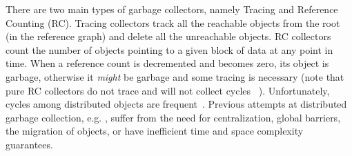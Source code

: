 There are two main types of garbage collectors, namely Tracing and Reference
Counting (RC). Tracing collectors track all the reachable objects from the root (in the reference graph)
and delete all the unreachable objects.
RC collectors
count the number of objects pointing to a given block of data at any point in
time.  When a reference count is decremented and becomes zero, its object is
garbage, otherwise it {\em might} be
garbage and some tracing is necessary (note that pure RC collectors do not trace and will not collect cycles ~\cite{rcfail}).  Unfortunately, cycles among distributed objects are
frequent~\cite{richer}.
Previous attempts at distributed garbage collection, e.g. \cite{Hudak:1982,Ladin,LeFessant,liskov97,liskov95,Veiga}, suffer from the need for centralization,
global barriers,
the migration of objects, or have inefficient time and space complexity guarantees.




